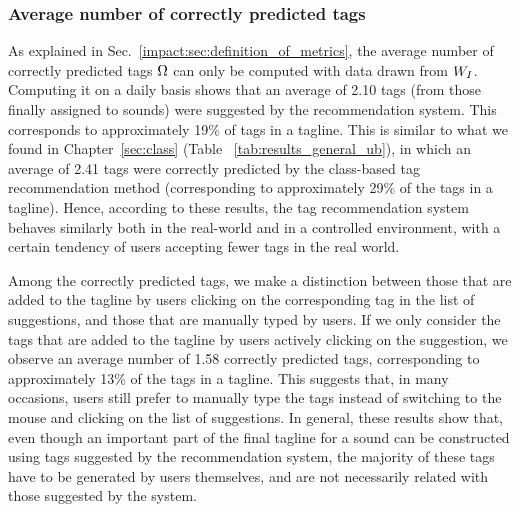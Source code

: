 \subsubsection{Average number of correctly predicted tags}
\label{impact:sec:percentage_correcly_predicted_tags_results}

As explained in Sec.~\ref{impact:sec:definition_of_metrics}, the average number of correctly predicted tags $\Omega$ can only be computed with data drawn from $W_I$. Computing it on a daily basis shows that an average of 2.10 tags (from those finally assigned to sounds) were suggested by the recommendation system. This corresponds to approximately 19\% of tags in a tagline. This is similar to what we found in Chapter~\ref{sec:class} (Table ~\ref{tab:results_general_ub}), in which an average of 2.41 tags were correctly predicted by the class-based tag recommendation method (corresponding to approximately 29\% of the tags in a tagline). 
Hence, according to these results, the tag recommendation system behaves similarly both in the real-world and in a controlled environment, with a certain tendency of users accepting fewer tags in the real world.

Among the correctly predicted tags, we make a distinction between those that are added to the tagline by users clicking on the corresponding tag in the list of suggestions, and those that are manually typed by users. If we only consider the tags that are added to the tagline by users actively clicking on the suggestion, we observe an average number of 1.58 correctly predicted tags, corresponding to approximately 13\% of the tags in a tagline. This suggests that, in many occasions, users still prefer to manually type the tags instead of switching to the mouse and clicking on the list of suggestions.
In general, these results show that, even though an important part of the final tagline for a sound can be constructed using tags suggested by the recommendation system, the majority of these tags have to be generated by users themselves, and are not necessarily related with those suggested by the system.



